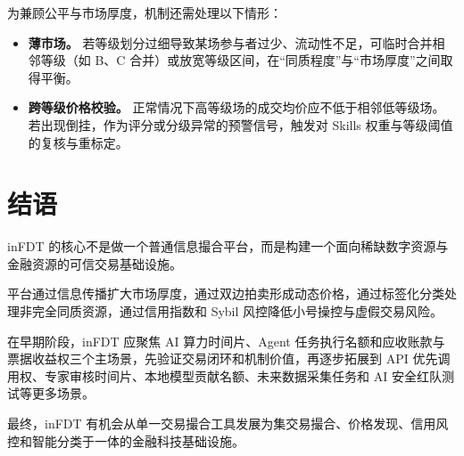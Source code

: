 \documentclass[UTF8,a4paper,12pt]{ctexart}
\begin{document}
为兼顾公平与市场厚度，机制还需处理以下情形：

\begin{itemize}
    \item \textbf{薄市场。} 若等级划分过细导致某场参与者过少、流动性不足，可临时合并相邻等级（如 B、C 合并）或放宽等级区间，在“同质程度”与“市场厚度”之间取得平衡。
    \item \textbf{跨等级价格校验。} 正常情况下高等级场的成交均价应不低于相邻低等级场。若出现倒挂，作为评分或分级异常的预警信号，触发对 Skills 权重与等级阈值的复核与重标定。
\end{itemize}



\section*{结语}

inFDT 的核心不是做一个普通信息撮合平台，而是构建一个面向稀缺数字资源与金融资源的可信交易基础设施。

平台通过信息传播扩大市场厚度，通过双边拍卖形成动态价格，通过标签化分类处理非完全同质资源，通过信用指数和 Sybil 风控降低小号操控与虚假交易风险。

在早期阶段，inFDT 应聚焦 AI 算力时间片、Agent 任务执行名额和应收账款与票据收益权三个主场景，先验证交易闭环和机制价值，再逐步拓展到 API 优先调用权、专家审核时间片、本地模型贡献名额、未来数据采集任务和 AI 安全红队测试等更多场景。

最终，inFDT 有机会从单一交易撮合工具发展为集交易撮合、价格发现、信用风控和智能分类于一体的金融科技基础设施。
\end{document}
